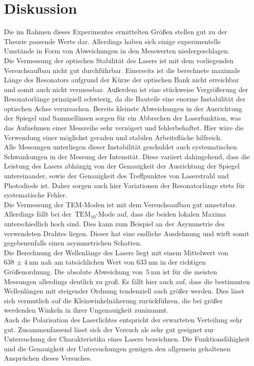 \section{Diskussion}
\label{sec:diskussion}
%
Die im Rahmen dieses Experimentes ermittelten Größen stellen gut zu der Theorie
passende Werte dar. Allerdings haben sich einige experimentelle Umstände in Form
von Abweichungen in den Messwerten niedergeschlagen. \\
Die Vermessung der optischen Stabilität des Lasers ist mit dem vorliegenden
Versuchsaufbau nicht gut durchführbar. Einerseits ist die berechnete maximale
Länge des Resonators aufgrund der Kürze der optischen Bank nicht erreichbar und
somit auch nicht vermessbar. Außerdem ist eine stückweise Vergrößerung der
Resonatorlänge prinzipiell schwierig, da die Bauteile eine enorme Instabilität
der optischen Achse verursachen. Bereits kleinste Abweichungen in der
Ausrichtung der Spiegel und Sammellinsen sorgen für ein Abbrechen der Laserfunktion,
was das Aufnehmen einer Messreihe sehr verzögert und fehlerbehaftet. Hier wäre
die Verwendung einer möglichst geraden und stabilen Arbeitsfläche hilfreich. \\
Alle Messungen unterliegen dieser Instabilität geschuldet auch systematischen
Schwankungen in der Messung der Intensität. Diese variiert dahingehend, dass
die Leistung des Lasers abhängig von der Genauigkeit der Ausrichtung der Spiegel
untereinander, sowie der Genauigkeit des Treffpunktes von Laserstrahl und
Photodiode ist. Daher sorgen auch hier Variationen der Resonatorlänge stets für
systematische Fehler. \\
Die Vermessung der TEM-Moden ist mit dem Versuchsaufbau gut umsetzbar.
Allerdings fällt bei der~$\text{TEM}_{10}$-Mode auf, dass die beiden lokalen
Maxima unterschiedlich hoch sind. Dies kann zum Beispiel an der Asymmetrie
des verwendeten Drahtes liegen. Dieser hat eine endliche Ausdehnung und wirft somit
gegebenenfalls einen asymmetrichen Schatten. \\
Die Berechnung der Wellenlänge des Lasers liegt mit einem Mittelwert von $\SI{638(4)}{\nano\meter}$ nah am
tatsächlichen Wert von $\SI{633}{\nano\meter}$ \cite{laser} in der richtigen Größenordnung.
Die absolute Abweichung von~$\SI{5}{\nano\meter}$ ist für die meisten Messungen
allerdings deutlich zu groß. Es fällt hier auch auf, dass die bestimmten Wellenlängen
mit steigender Ordnung tendenziell auch größer werden. Dies lässt sich vermutlich
auf die Kleinwinkelnäherung zurückführen, die bei größer werdenden Winkeln in ihrer
Ungenauigkeit zunimmmt. \\
Auch die Polarisation des Laserlichtes entspricht der erwarteten Verteilung sehr
gut. Zusammenfassend lässt sich der Versuch als sehr gut geeignet zur
Untersuchung der Charakteristika eines Lasers bezeichnen. Die Funktionsfähigkeit
und die Genauigkeit der Untersuchungen genügen den allgemein gehaltenen
Ansprüchen dieses Versuches.

